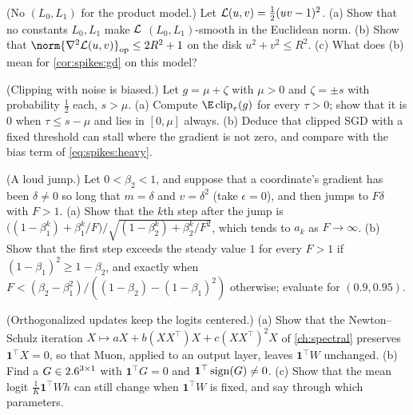 \begin{refsection}
\begin{exercises}
\item \variation (No $(L_0,L_1)$ for the product model.) Let $\mathcal{L}(u,v)=\frac12(uv-1)^2$. (a) Show that no constants $L_0,L_1$ make $\mathcal{L}$ $(L_0,L_1)$-smooth in the Euclidean norm. (b) Show that $\norm{\nabla^2\Loss(u,v)}_{\op}\le2R^2+1$ on the disk $u^2+v^2\le R^2$. (c) What does (b) mean for \cref{cor:spikes:gd} on this model?\label{ex:spikes:product}

\item \variation (Clipping with noise is biased.) Let $g=\mu+\zeta$ with $\mu>0$ and $\zeta=\pm s$ with probability $\frac12$ each, $s>\mu$. (a) Compute $\E\spikesclip_\tau(g)$ for every $\tau>0$; show that it is $0$ when $\tau\le s-\mu$ and lies in $[0,\mu]$ always. (b) Deduce that clipped SGD with a fixed threshold can stall where the gradient is not zero, and compare with the bias term of \eqref{eq:spikes:heavy}.\label{ex:spikes:bias}

\item \variation\hard (A loud jump.) Let $0<\beta_2<1$, and suppose that a coordinate's gradient has been $\delta\ne0$ so long that $m=\delta$ and $v=\delta^2$ (take $\epsilon=0$), and then jumps to $F\delta$ with $F>1$. (a) Show that the $k$th step after the jump is $\bigl((1-\beta_1^k)+\beta_1^k/F\bigr)/\sqrt{(1-\beta_2^k)+\beta_2^k/F^2}$, which tends to $a_k$ as $F\to\infty$. (b) Show that the first step exceeds the steady value $1$ for every $F>1$ if $(1-\beta_1)^2\ge1-\beta_2$, and exactly when $F<(\beta_2-\beta_1^2)/((1-\beta_2)-(1-\beta_1)^2)$ otherwise; evaluate for $(0.9,0.95)$. \label{ex:spikes:jump}

\item \variation (Orthogonalized updates keep the logits centered.) (a) Show that the Newton--Schulz iteration $X\mapsto aX+b(XX^\top)X+c(XX^\top)^2X$ of \cref{ch:spectral} preserves $\mathbf1^\top X=0$, so that Muon, applied to an output layer, leaves $\mathbf1^\top W$ unchanged. (b) Find a $G\in2.6^{3\times1}$ with $\mathbf1^\top G=0$ and $\mathbf1^\top\operatorname{sign}(G)\ne0$. (c) Show that the mean logit $\frac1K\mathbf1^\top Wh$ can still change when $\mathbf1^\top W$ is fixed, and say through which parameters.\label{ex:spikes:muonmean}


\end{exercises}
\end{refsection}
